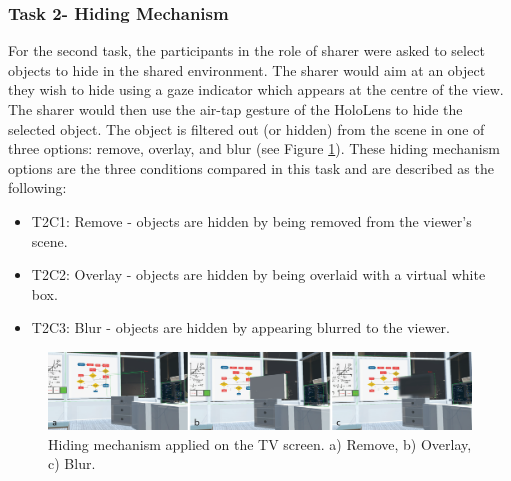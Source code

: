 \subsubsection{Task 2- Hiding Mechanism}

For the second task, the participants in the role of sharer were asked to select objects to hide in the shared environment. The sharer would aim at an object they wish to hide using a gaze indicator which appears at the centre of the view. The sharer would then use the air-tap gesture of the HoloLens to hide the selected object. The object is filtered out (or hidden) from the scene in one of three options: remove, overlay, and blur (see Figure \ref{fig:frontier18:hiding-mechanism}). These hiding mechanism options are the three conditions compared in this task and are described as the following:

\begin{itemize}
\item T2C1: Remove - objects are hidden by being removed from the viewer's scene.
\item T2C2: Overlay - objects are hidden by being overlaid with a virtual white box. 
\item T2C3: Blur - objects are hidden by appearing blurred to the viewer. 
\end{itemize}

\begin{figure}[h]
    \begin{center}
    \includegraphics[width=\linewidth]{images/54-hiding-frontier18/images-01.png}
    \caption{Hiding mechanism applied on the TV screen. a) Remove, b) Overlay, c) Blur.}\label{fig:frontier18:hiding-mechanism}
    \end{center}
\end{figure}



